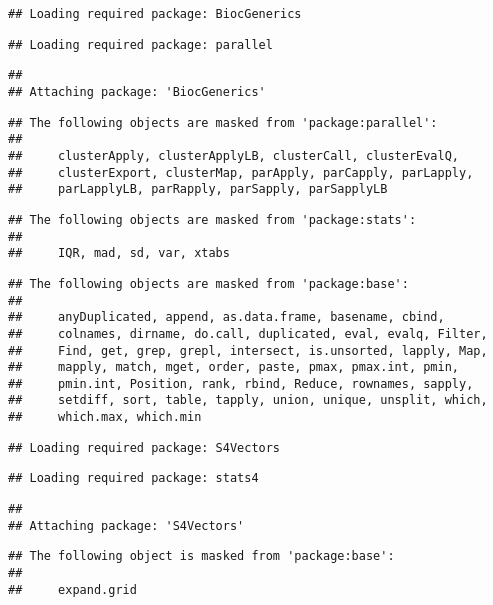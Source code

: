 \documentclass[]{article}
\begin{document}
\begin{verbatim}
## Loading required package: BiocGenerics
\end{verbatim}

\begin{verbatim}
## Loading required package: parallel
\end{verbatim}

\begin{verbatim}
## 
## Attaching package: 'BiocGenerics'
\end{verbatim}

\begin{verbatim}
## The following objects are masked from 'package:parallel':
## 
##     clusterApply, clusterApplyLB, clusterCall, clusterEvalQ,
##     clusterExport, clusterMap, parApply, parCapply, parLapply,
##     parLapplyLB, parRapply, parSapply, parSapplyLB
\end{verbatim}

\begin{verbatim}
## The following objects are masked from 'package:stats':
## 
##     IQR, mad, sd, var, xtabs
\end{verbatim}

\begin{verbatim}
## The following objects are masked from 'package:base':
## 
##     anyDuplicated, append, as.data.frame, basename, cbind,
##     colnames, dirname, do.call, duplicated, eval, evalq, Filter,
##     Find, get, grep, grepl, intersect, is.unsorted, lapply, Map,
##     mapply, match, mget, order, paste, pmax, pmax.int, pmin,
##     pmin.int, Position, rank, rbind, Reduce, rownames, sapply,
##     setdiff, sort, table, tapply, union, unique, unsplit, which,
##     which.max, which.min
\end{verbatim}

\begin{verbatim}
## Loading required package: S4Vectors
\end{verbatim}

\begin{verbatim}
## Loading required package: stats4
\end{verbatim}

\begin{verbatim}
## 
## Attaching package: 'S4Vectors'
\end{verbatim}

\begin{verbatim}
## The following object is masked from 'package:base':
## 
##     expand.grid
\end{verbatim}
\end{document}
